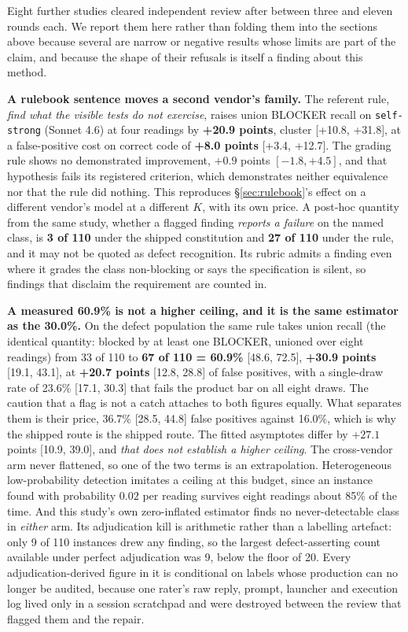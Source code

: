 Eight further studies cleared independent review after between three and eleven rounds each. We
report them here rather than folding them into the sections above because several are narrow or
negative results whose limits are part of the claim, and because the shape of their refusals is
itself a finding about this method.

\textbf{A rulebook sentence moves a second vendor's family.} The referent rule, \emph{find what the
visible tests do not exercise}, raises union BLOCKER recall on \texttt{self-strong} (Sonnet 4.6)
at four readings by \textbf{+20.9 points}, cluster [+10.8, +31.8], at a false-positive cost on
correct code of \textbf{+8.0 points} [+3.4, +12.7]. The grading rule shows no demonstrated
improvement, $+0.9$ points $[-1.8, +4.5]$, and that hypothesis fails its registered criterion,
which demonstrates neither equivalence nor that the rule did nothing. This reproduces
\S\ref{sec:rulebook}'s effect on a different vendor's model at a different $K$, with its own
price. A post-hoc quantity from the same study, whether a flagged finding \emph{reports a failure}
on the named class, is \textbf{3 of 110} under the shipped constitution and \textbf{27 of 110}
under the rule, and it may not be quoted as defect recognition. Its rubric admits a finding even
where it grades the class non-blocking or says the specification is silent, so findings that
disclaim the requirement are counted in.

\textbf{A measured 60.9\% is not a higher ceiling, and it is the same estimator as the 30.0\%.}
On the defect population the same rule takes union recall (the identical quantity: blocked by at
least one BLOCKER, unioned over eight readings) from 33 of 110 to \textbf{67 of 110 = 60.9\%}
[48.6, 72.5], \textbf{+30.9 points} [19.1, 43.1], at \textbf{+20.7 points} [12.8, 28.8] of false
positives, with a single-draw rate of 23.6\% [17.1, 30.3] that fails the product bar on all eight
draws. The caution that a flag is not a catch attaches to both figures equally. What separates
them is their price, 36.7\% [28.5, 44.8] false positives against 16.0\%, which is why the shipped
route is the shipped route. The fitted asymptotes differ by $+27.1$ points [10.9, 39.0], and
\emph{that does not establish a higher ceiling}. The cross-vendor arm never flattened, so one of
the two terms is an extrapolation. Heterogeneous low-probability detection imitates a ceiling at
this budget, since an instance found with probability $0.02$ per reading survives eight readings
about 85\% of the time. And this study's own zero-inflated estimator finds no never-detectable
class in \emph{either} arm. Its adjudication kill is arithmetic rather than a labelling artefact:
only 9 of 110 instances drew any finding, so the largest defect-asserting count available under
perfect adjudication was 9, below the floor of 20. Every adjudication-derived figure in it is
conditional on labels whose production can no longer be audited, because one rater's raw reply,
prompt, launcher and execution log lived only in a session scratchpad and were destroyed between
the review that flagged them and the repair.

